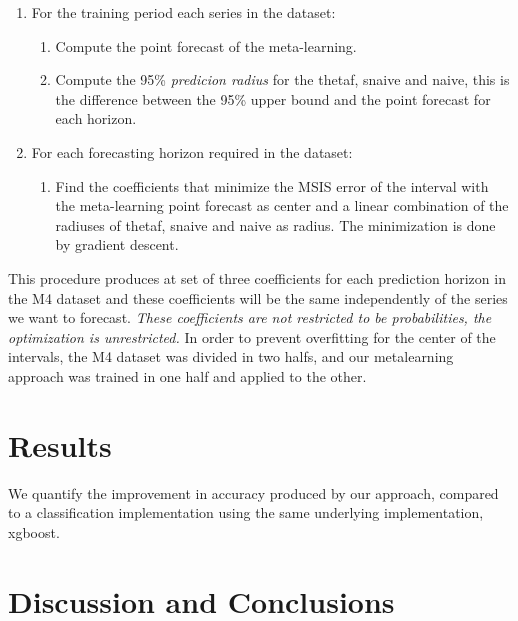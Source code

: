 \documentclass[11pt,a4paper,]{article}
\providecommand{\tightlist}{%
  \setlength{\itemsep}{0pt}\setlength{\parskip}{0pt}}
\theoremstyle{definition}
\theoremstyle{definition}
\theoremstyle{definition}
\theoremstyle{remark}
\begin{document}
\begin{enumerate}
\def\labelenumi{\arabic{enumi}.}
\tightlist
\item
  For the training period each series in the dataset:

  \begin{enumerate}
  \def\labelenumii{\arabic{enumii}.}
  \tightlist
  \item
    Compute the point forecast of the meta-learning.
  \item
    Compute the 95\% \emph{predicion radius} for the thetaf, snaive and
    naive, this is the difference between the 95\% upper bound and the
    point forecast for each horizon.
  \end{enumerate}
\item
  For each forecasting horizon required in the dataset:

  \begin{enumerate}
  \def\labelenumii{\arabic{enumii}.}
  \tightlist
  \item
    Find the coefficients that minimize the MSIS error of the interval
    with the meta-learning point forecast as center and a linear
    combination of the radiuses of thetaf, snaive and naive as radius.
    The minimization is done by gradient descent.
  \end{enumerate}
\end{enumerate}

This procedure produces at set of three coefficients for each prediction
horizon in the M4 dataset and these coefficients will be the same
independently of the series we want to forecast. \emph{These
coefficients are not restricted to be probabilities, the optimization is
unrestricted.} In order to prevent overfitting for the center of the
intervals, the M4 dataset was divided in two halfs, and our metalearning
approach was trained in one half and applied to the other.

\section{Results}\label{results}

We quantify the improvement in accuracy produced by our approach,
compared to a classification implementation using the same underlying
implementation, xgboost.

\section{Discussion and Conclusions}\label{conclusion}

\printbibliography[title=References]
\end{document}
